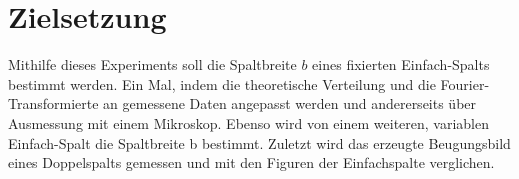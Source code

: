\section{Zielsetzung}
\label{sec:Zielsetzung}

Mithilfe dieses Experiments soll die Spaltbreite $b$ eines fixierten 
Einfach-Spalts bestimmt werden. Ein Mal, indem die theoretische Verteilung und
die Fourier-Transformierte an gemessene Daten angepasst werden und andererseits 
über Ausmessung mit einem Mikroskop. Ebenso wird von einem weiteren, variablen
Einfach-Spalt die Spaltbreite b bestimmt. Zuletzt wird das erzeugte Beugungsbild
eines Doppelspalts gemessen und mit den Figuren der Einfachspalte verglichen.